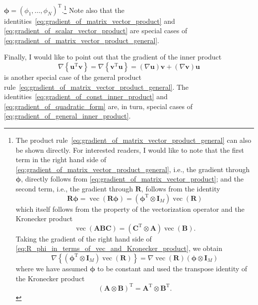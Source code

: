 \documentclass[12pt,a4paper]{article}
\begin{document}
$\bm{\phi} = \left(\phi_1, \dots, \phi_N\right)^{\operatorname{T}}$.\footnote{%
The product rule~\eqref{eq:gradient_of_matrix_vector_product_general} can also be shown directly.
For interested readers, I would like to note that
the first term in the right hand side of
\eqref{eq:gradient_of_matrix_vector_product_general},
i.e., the gradient through $\bm{\phi}$, directly follows from
\eqref{eq:gradient_of_matrix_vector_product}; and
the second term, i.e., the gradient through $\mathbf{R}$, follows from the identity
\begin{equation}
\mathbf{R} \bm{\phi} = \operatorname{vec} \left( \mathbf{R} \bm{\phi} \right)
= \left( \bm{\phi}^{\operatorname{T}} \otimes \mathbf{I}_M \right)
\operatorname{vec} \left( \mathbf{R} \right)
\label{eq:R_phi_in_terms_of_vec_and_Kronecker_product}
\end{equation}
which itself follows from the property of the vectorization operator and the Kronecker product~%
\citep{MagnusNeudecker:MDC}
\begin{equation}
\operatorname{vec}\left( \mathbf{A} \mathbf{B} \mathbf{C} \right)
= \left( \mathbf{C}^{\operatorname{T}} \otimes \mathbf{A} \right)
\operatorname{vec}\left( \mathbf{B} \right) .
\end{equation}
Taking the gradient of the right hand side of
\eqref{eq:R_phi_in_terms_of_vec_and_Kronecker_product},
we obtain
\begin{equation}
\nabla
\left\{
\left( \bm{\phi}^{\operatorname{T}} \otimes \mathbf{I}_M \right)
\operatorname{vec} \left( \mathbf{R} \right)
\right\}
=
\nabla
\operatorname{vec} \left( \mathbf{R} \right)
\left( \bm{\phi} \otimes \mathbf{I}_M \right)
\end{equation}
where we have assumed $\bm{\phi}$ to be constant and
used the transpose identity of the Kronecker product~\citep{MagnusNeudecker:MDC}
\begin{equation}
\left(\mathbf{A}\otimes\mathbf{B}\right)^{\operatorname{T}} =
\mathbf{A}^{\operatorname{T}} \otimes \mathbf{B}^{\operatorname{T}} .
\end{equation}
}
Note also that
the identities~\eqref{eq:gradient_of_matrix_vector_product} and
\eqref{eq:gradient_of_scalar_vector_product}
are special cases of
\eqref{eq:gradient_of_matrix_vector_product_general}.

Finally, I would like to point out that the gradient of the inner product
\begin{equation}
\nabla \left\{ \mathbf{u}^{\operatorname{T}} \mathbf{v} \right\} =
\nabla \left\{ \mathbf{v}^{\operatorname{T}} \mathbf{u} \right\} =
\left(\nabla\mathbf{u}\right) \mathbf{v} +
\left(\nabla\mathbf{v}\right) \mathbf{u}
\label{eq:gradient_of_general_inner_product}
\end{equation}
is another special case of
the general product rule~\eqref{eq:gradient_of_matrix_vector_product_general}.
The identities~\eqref{eq:gradient_of_const_inner_product} and
\eqref{eq:gradient_of_quadratic_form}
are, in turn, special cases of \eqref{eq:gradient_of_general_inner_product}.
\end{document}
